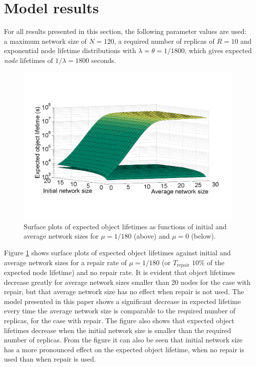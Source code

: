 \documentclass[10pt,a4paper,conference]{IEEEtran}
\begin{document}
\section{Model results}
\label{results}

For all results presented in this section, the following parameter values are used: a maximum network size of $N=120$, a required number of replicas of $R = 10$ and exponential node lifetime distributions with $\lambda = \theta = 1/1800$, which gives expected \emph{node} lifetimes of $1/\lambda = 1800$ seconds.


\begin{figure}[htbp]
 \centering
 \includegraphics[clip=true, viewport=1.5cm 3.5cm 28.0cm 16.5cm, width=\columnwidth]{lifetime_av_init_groupsize}
 \caption{Surface plots of expected object lifetimes as functions of initial and average network sizes for $\mu = 1/180$ (above) and $\mu = 0$ (below).}
 \label{fig_lifetime_average_vs_initial}
\end{figure}
%
Figure \ref{fig_lifetime_average_vs_initial} shows surface plots of expected object lifetimes against initial and average network sizes for a repair rate of $\mu = 1/180$ (or $T_{\textrm{repair}}$ $10\%$ of the expected node lifetime) and no repair rate. It is evident that object lifetimes decrease greatly for average network sizes smaller than 20 nodes for the case with repair, but that average network size has no effect when repair is not used. The model presented in this paper shows a significant decrease in expected lifetime every time the average network size is comparable to the required number of replicas, for the case with repair. The figure also shows that expected object lifetimes decrease when the initial network size is smaller than the required number of replicas. From the figure it can also be seen that initial network size has a more pronounced effect on the expected object lifetime, when no repair is used than when repair is used.
\end{document}
